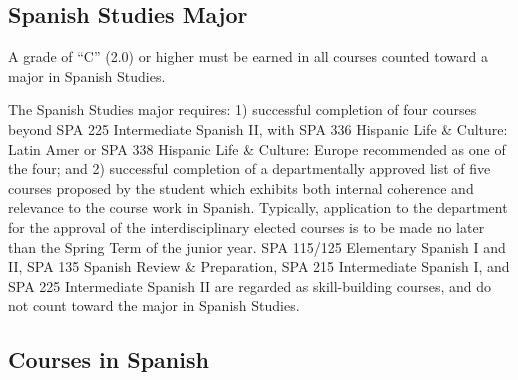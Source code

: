 \documentclass[
  letterpaper,
]{scrbook}
\begin{document}
\subsection{Spanish Studies Major}\label{spanish-studies-major}

A grade of ``C'' (2.0) or higher must be earned in all courses counted
toward a major in Spanish Studies.

The Spanish Studies major requires: 1) successful completion of four
courses beyond SPA 225 Intermediate Spanish II, with SPA 336 Hispanic
Life \& Culture: Latin Amer or SPA 338 Hispanic Life \& Culture: Europe
recommended as one of the four; and 2) successful completion of a
departmentally approved list of five courses proposed by the student
which exhibits both internal coherence and relevance to the course work
in Spanish. Typically, application to the department for the approval of
the interdisciplinary elected courses is to be made no later than the
Spring Term of the junior year. SPA 115/125 Elementary Spanish I and II,
SPA 135 Spanish Review \& Preparation, SPA 215 Intermediate Spanish I,
and SPA 225 Intermediate Spanish II are regarded as skill-building
courses, and do not count toward the major in Spanish Studies.

\subsection{Courses in Spanish}\label{courses-in-spanish}
\end{document}
